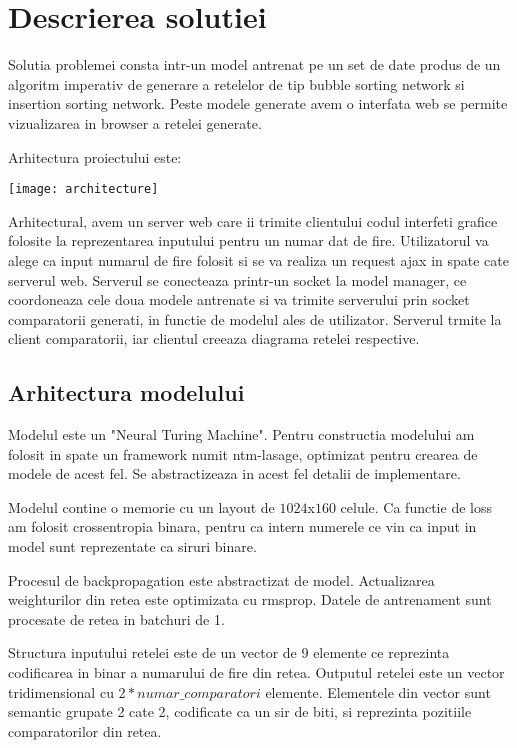 \documentclass[12pt]{article}
\begin{document}
\section{Descrierea solutiei}
Solutia problemei consta intr-un model antrenat pe un set de date produs de un algoritm imperativ de generare a retelelor de tip bubble sorting network si insertion sorting network. Peste modele generate avem o interfata web se permite vizualizarea in browser a retelei generate.

Arhitectura proiectului este:

\begin{center}
\texttt{[image: architecture]}
\end{center}

Arhitectural, avem un server web care ii trimite clientului codul interfeti grafice folosite la reprezentarea inputului pentru un numar dat de fire. Utilizatorul va alege ca input numarul de fire folosit si se va realiza un request ajax in spate cate serverul web. Serverul se conecteaza printr-un socket la model manager, ce coordoneaza cele doua modele antrenate si va trimite serverului prin socket comparatorii generati, in functie de modelul ales de utilizator. Serverul trmite la client comparatorii, iar clientul creeaza diagrama retelei respective.

\subsection{Arhitectura modelului}

Modelul este un "Neural Turing Machine". Pentru constructia modelului am folosit in spate un framework numit ntm-lasage, optimizat pentru crearea de modele de acest fel. Se abstractizeaza in acest fel detalii de implementare. 

Modelul contine o memorie cu un layout de $1024$x$160$ celule. Ca functie de loss am folosit crossentropia binara, pentru ca intern numerele ce vin ca input in model sunt reprezentate ca siruri binare.

Procesul de backpropagation este abstractizat de model. Actualizarea weighturilor din retea este optimizata cu rmsprop.
Datele de antrenament sunt procesate de retea in batchuri de 1.

Structura inputului retelei este de un vector de 9 elemente ce reprezinta codificarea in binar a numarului de fire din retea. Outputul retelei este un vector tridimensional cu $2*numar\_comparatori$ elemente. Elementele din vector sunt semantic grupate 2 cate 2, codificate ca un sir de biti, si reprezinta pozitiile comparatorilor din retea. 
\end{document}
